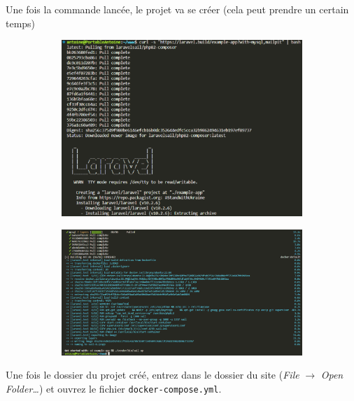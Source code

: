         Une fois la commande lancée, le projet va se créer (cela peut prendre un certain temps)

        \begin{figure}[h]
            \centering
            \begin{subfigure}{0.3\textwidth}
                \includegraphics[width=\textwidth]{Images_formation/CreateProject1.pdf}
            \end{subfigure}
            \begin{subfigure}{0.3\textwidth}
                \includegraphics[width=\textwidth]{Images_formation/CreateProject2.pdf}
            \end{subfigure}
        \end{figure}

        Une fois le dossier du projet créé, entrez dans le dossier du site (\textit{File} $\rightarrow$ \textit{Open Folder\ldots}) et ouvrez le fichier \verb|docker-compose.yml|.

